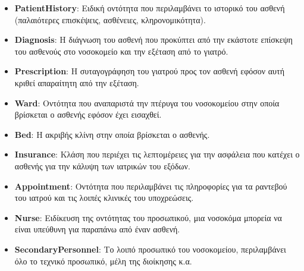 \documentclass{article}
\begin{document}
\begin{itemize}
    \item \textbf{PatientHistory}: Ειδική οντότητα που περιλαμβάνει το ιστορικό του ασθενή (παλαιότερες επισκέψεις, ασθένειες, κληρονομικότητα).
    \item \textbf{Diagnosis}: Η διάγνωση του ασθενή που προκύπτει από την εκάστοτε επίσκεψη του ασθενούς στο νοσοκομείο και την εξέταση από το γιατρό.
    \item \textbf{Prescription}: Η συταγογράφηση του γιατρού προς τον ασθενή εφόσον αυτή κριθεί απαραίτητη από την εξέταση.
    \item \textbf{Ward}: Οντότητα που αναπαριστά την πτέρυγα του νοσοκομείου στην οποία βρίσκεται ο ασθενής εφόσον έχει εισαχθεί.
    \item \textbf{Bed}: Η ακριβής κλίνη στην οποία βρίσκεται ο ασθενής.
    \item \textbf{Insurance}: Κλάση που περιέχει τις λεπτομέρειες για την ασφάλεια που κατέχει ο ασθενής για την κάλυψη των ιατρικών του εξόδων.
    \item \textbf{Appointment}: Οντότητα που περιλαμβάνει τις πληροφορίες για τα ραντεβού του ιατρού και τις λοιπές κλινικές του υποχρεώσεις.
    \item \textbf{Nurse}: Ειδίκευση της οντότητας του προσωπικού, μια νοσοκόμα μπορεία να είναι υπεύθυνη για παραπάνω από έναν ασθενή.
    \item \textbf{SecondaryPersonnel}: Το λοιπό προσωπικό του νοσοκομείου, περιλαμβάνει όλο το τεχνικό προσωπικό, μέλη της διοίκησης κ.α.
\end{itemize}
\end{document}
